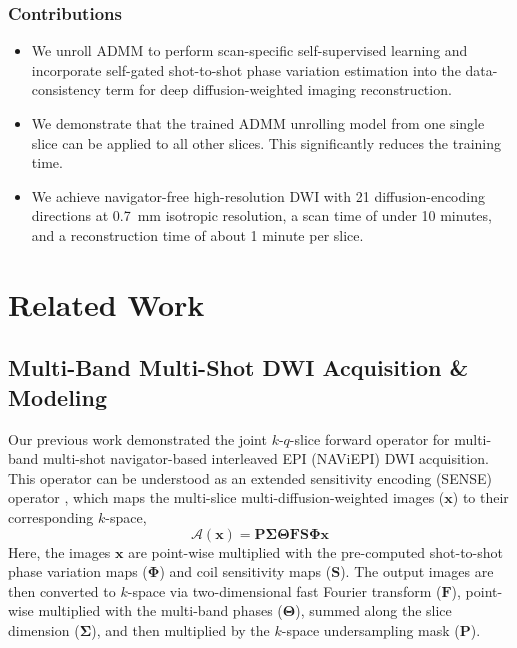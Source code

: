 \documentclass[journal,twoside,web]{ieeecolor}
\begin{document}
	\subsubsection*{Contributions}
	\begin{itemize}
		\item We unroll ADMM to perform scan-specific self-supervised learning 
		and incorporate self-gated shot-to-shot phase variation estimation 
		into the data-consistency term for deep diffusion-weighted imaging reconstruction.
		\item We demonstrate that the trained ADMM unrolling model from one single slice 
		can be applied to all other slices. 
		This significantly reduces the training time.
		\item We achieve navigator-free high-resolution DWI with 21 diffusion-encoding
		directions at \SI{0.7}{\milli\meter} isotropic resolution,
		a scan time of under 10 minutes, and a reconstruction time of about 1 minute per slice.
	\end{itemize}


	\section{Related Work}


	\subsection{Multi-Band Multi-Shot DWI Acquisition \& Modeling} \label{SEC:FWD}

	Our previous work \cite{tan_2024_naviepi} demonstrated
	the joint $k$-$q$-slice forward operator
	for multi-band multi-shot navigator-based interleaved EPI (NAViEPI) DWI acquisition.
	This operator can be understood as
	an extended sensitivity encoding (SENSE) operator \cite{pruessmann_2001_gsense},
	which maps the multi-slice multi-diffusion-weighted images ($\mathbf{x}$)
	to their corresponding $k$-space,
	\begin{equation}
		\mathcal{A}(\mathbf{x}) = \mathbf{P \Sigma \Theta F S \Phi} \mathbf{x}
		\label{EQU:FWD}
	\end{equation}
	Here, the images $\mathbf{x}$ are point-wise multiplied
	with the pre-computed shot-to-shot phase variation maps ($\mathbf{\Phi}$)
	and coil sensitivity maps ($\mathbf{S}$).
	The output images are then converted to $k$-space
	via two-dimensional fast Fourier transform ($\mathbf{F}$),
	point-wise multiplied with the multi-band phases ($\mathbf{\Theta}$),
	summed along the slice dimension ($\mathbf{\Sigma}$),
	and then multiplied by the $k$-space undersampling mask ($\mathbf{P}$).
\end{document}
